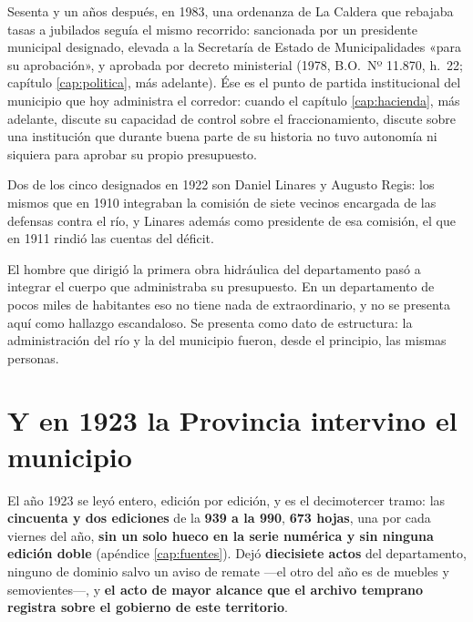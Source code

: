 Sesenta y un años después, en 1983, una ordenanza de La Caldera que rebajaba tasas a
jubilados seguía el mismo recorrido: sancionada por un presidente municipal designado,
elevada a la Secretaría de Estado de Municipalidades «para su aprobación», y aprobada por
decreto ministerial (1978, B.O.\ Nº 11.870, h.\ 22; capítulo \ref{cap:politica}, más adelante). Ése es el punto de partida institucional del municipio que hoy
administra el corredor: cuando el capítulo \ref{cap:hacienda}, más adelante, discute su capacidad de control sobre el
fraccionamiento, discute sobre una institución que durante buena parte de su historia no
tuvo autonomía ni siquiera para aprobar su propio presupuesto.

Dos de los cinco designados en 1922 son Daniel Linares y Augusto Regis: los mismos que en
1910 integraban la comisión de siete vecinos encargada de las defensas contra el río, y
Linares además como presidente de esa comisión, el que en 1911 rindió las cuentas del
déficit.

El hombre que dirigió la primera obra hidráulica del departamento pasó a integrar el cuerpo
que administraba su presupuesto. En un departamento de pocos miles de habitantes eso
no tiene nada de extraordinario, y no se presenta aquí como hallazgo escandaloso. Se
presenta como dato de estructura: la administración del río y la del municipio fueron,
desde el principio, las mismas personas.

\section{Y en 1923 la Provincia intervino el municipio}

El año 1923 se leyó entero, edición por edición, y es el decimotercer tramo: las
\textbf{cincuenta y dos ediciones} de la \textbf{939 a la 990}, \textbf{673 hojas}, una por cada
viernes del año, \textbf{sin un solo hueco en la serie numérica y sin ninguna edición doble}
(apéndice \ref{cap:fuentes}). Dejó \textbf{diecisiete actos} del departamento, ninguno de
dominio salvo un aviso de remate ---el otro del año es de muebles y semovientes---, y \textbf{el acto de mayor alcance que el archivo temprano
registra sobre el gobierno de este territorio}.

